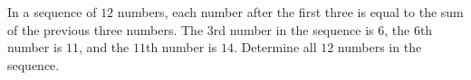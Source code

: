 In a sequence of $12$ numbers, each number after the first three is equal to the sum of the previous three numbers. The $3$rd number in the sequence is $6$, the $6$th number is $11$, and the $11$th number is $14$. Determine all $12$ numbers in the sequence.
